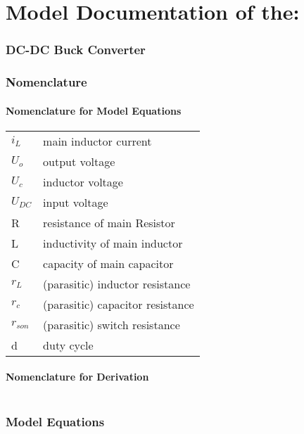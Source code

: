 \documentclass[10pt,a4paper]{article}
\begin{document}
	\part*{Model Documentation of the:}
	\section*{DC-DC Buck Converter} %
	
	
	\section{Nomenclature} %
	\subsection{Nomenclature for Model Equations} %
	
	\begin{tabular}{ll}
		$i_L$ & main inductor current \\
		$U_o$ & output voltage \\
		$U_c$ & inductor voltage \\
		$U_{DC}$ & input voltage \\
		R & resistance of main Resistor \\
		L & inductivity of main inductor \\
		C & capacity of main capacitor \\
		$r_L$ & (parasitic) inductor resistance \\
		$r_c$ & (parasitic) capacitor resistance \\
		$r_{son}$ & (parasitic) switch resistance \\
		d & duty cycle
	\end{tabular}
	
	\subsection{Nomenclature for Derivation} %
	
	\begin{tabular}{ll}
	\end{tabular}
	
	
	\section{Model Equations} %
	
\end{document}
